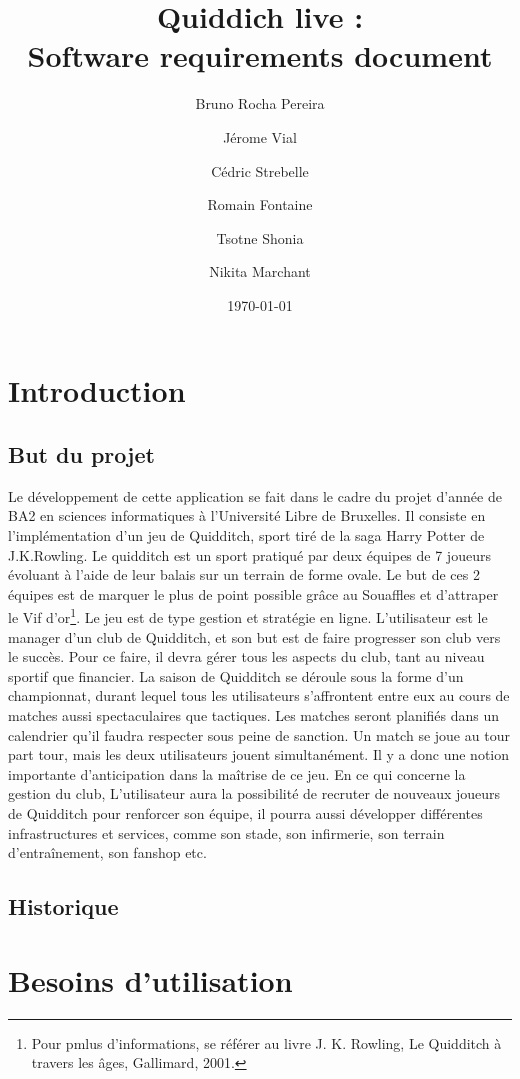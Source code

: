 \documentclass[a4paper]{article}
\title{Quiddich live : \\Software requirements document}
\author{Bruno Rocha Pereira \and Jérome Vial \and Cédric Strebelle \and
Romain Fontaine \and Tsotne Shonia \and Nikita Marchant}
\date{\today}
\begin{document}
\maketitle

\section{Introduction}
\subsection{But du projet}
Le développement de cette application se fait dans le cadre du projet d'année de BA2 en sciences informatiques à l'Université Libre de Bruxelles. Il consiste en l'implémentation d'un jeu de Quidditch, sport tiré de la saga Harry Potter de J.K.Rowling. 
Le quidditch est un sport pratiqué par deux équipes de 7 joueurs évoluant à l'aide de leur balais sur un terrain de forme ovale. Le but de ces 2 équipes est de marquer le plus de point possible grâce au Souaffles et d'attraper le Vif d'or\footnote{Pour pmlus d'informations, se référer au livre J. K. Rowling, Le Quidditch à travers les âges, Gallimard, 2001.}. 
Le jeu est de type gestion et stratégie en ligne. L'\gls{utilisateur} est le manager d'un club de Quidditch, et son but est de faire progresser son club vers le succès. Pour ce faire, il devra gérer tous les aspects du club, tant au niveau sportif que financier. La saison de Quidditch se déroule sous la forme d'un championnat, durant lequel tous les \glspl{utilisateur} s'affrontent entre eux au cours de matches aussi spectaculaires que tactiques. Les matches seront planifiés dans un calendrier qu'il faudra respecter sous peine de sanction. Un match se joue au tour part tour, mais les deux \glspl{utilisateur} jouent simultanément. Il y a donc une notion importante d'anticipation dans la maîtrise de ce jeu. En ce qui concerne la gestion du club, L'\gls{utilisateur} aura la possibilité de recruter de nouveaux joueurs de Quidditch pour renforcer son équipe, il pourra aussi développer différentes infrastructures et services, comme son stade, son infirmerie, son terrain d'entraînement, son fanshop etc.

\printglossary[numberedsection]
\subsection{Historique}

\section{Besoins d'utilisation}
\end{document}
